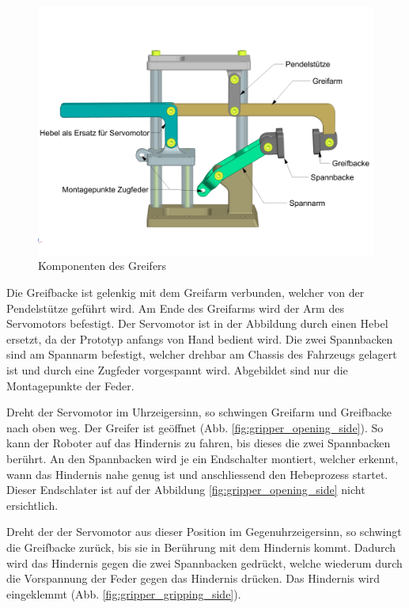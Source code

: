 \begin{figure}[H]
\centering
\includegraphics[width=1.0\linewidth]{assets/greifer-prototyp/Greifer_side_Komponentennamen.png} 
\caption{Komponenten des Greifers}
\label{fig:gripper_components}
\end{figure}

Die Greifbacke ist gelenkig mit dem Greifarm verbunden, welcher von der Pendelstütze geführt wird. Am Ende des Greifarms wird der Arm des Servomotors befestigt. Der Servomotor ist in der Abbildung durch einen Hebel ersetzt, da der Prototyp anfangs von Hand bedient wird. Die zwei Spannbacken sind am Spannarm befestigt, welcher drehbar am Chassis des Fahrzeugs gelagert ist und durch eine Zugfeder vorgespannt wird. Abgebildet sind nur die Montagepunkte der Feder.

\newpage

Dreht der Servomotor im Uhrzeigersinn, so schwingen Greifarm und Greifbacke nach oben weg. Der Greifer ist geöffnet (Abb. \ref{fig:gripper_opening_side}). So kann der Roboter auf das Hindernis zu fahren, bis dieses die zwei Spannbacken berührt. An den Spannbacken wird je ein Endschalter montiert, welcher erkennt, wann das Hindernis nahe genug ist und anschliessend den Hebeprozess startet. Dieser Endschlater ist auf der Abbildung \ref{fig:gripper_opening_side} nicht ersichtlich.

Dreht der der Servomotor aus dieser Position im Gegenuhrzeigersinn, so schwingt die Greifbacke zurück, bis sie in Berührung mit dem Hindernis kommt. Dadurch wird das Hindernis gegen die zwei Spannbacken gedrückt, welche wiederum durch die Vorspannung der Feder gegen das Hindernis drücken. Das Hindernis wird eingeklemmt (Abb. \ref{fig:gripper_gripping_side}).

